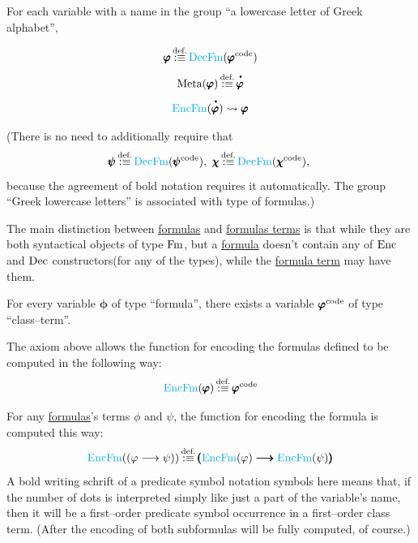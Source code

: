 \begin{metanotation}
\begin{definition}
For each variable with a name in the group ``a lowercase letter of Greek alphabet'',

\[
\pmb{\varphi}
\,{\stackrel{{\textrm{def.}}}{:\equiv}}\,
{\text{\textcolor{cyan}{DecFm}}}(\pmb{\varphi}^{\text{code}})
\]
\[
\text{Meta}(\pmb{\phi})
\equivdef
\meta{\pmb{\phi}}
\]
\[
\EncFm(\meta{\pmb{\phi}})
\reductsto
\pmb{\phi}
\]


(There is no need to additionally require that
\[
\pmb{\psi}
\equivdef
\DecFm({\pmb{\psi}^\code})
,\ %
\pmb{\chi}
\equivdef
\DecFm({\pmb{\chi}^\code})
,\ %
\]
because the agreement of bold notation requires it automatically. The group ``Greek lowercase letters'' is associated with type of formulas.)

\end{definition}

\begin{note}
The main distinction between \underline{formulas} and \underline{formulas terms} is that while they are both syntactical objects of type $\mathrm{Fm}$, but a \underline{formula} doesn't contain any of ${\text{Enc}}$ and ${\text{Dec}}$ constructors(for any of the types), while the \underline{formula term} may have them.
\end{note}
\begin{axiom}
For every variable $\pmb{\phi}$ of type ``formula'', there exists a variable  $\pmb{\varphi}^{\text{code}}$ of type ``class--term''.
\end{axiom}
\begin{definition}
The axiom above allows the function for encoding the formulas defined to be computed in the following way:
\[
{\text{\textcolor{cyan}{EncFm}}}(\pmb{\varphi})
\,{\stackrel{{\textrm{def.}}}{:\equiv}}\,
{\pmb{\varphi}}^{\text{code}}
\]
\end{definition}
\begin{definition}
For any \underline{formulas}'s terms $\phi$ and $\psi$, the function for encoding the formula is computed this way:
\[
{\text{\textcolor{cyan}{EncFm}}}((\varphi \longrightarrow \psi))
\,{\stackrel{{\textrm{def.}}}{:\equiv}}\,
\pmb{(}{\text{\textcolor{cyan}{EncFm}}}(\varphi) \pmb{\longrightarrow} {\text{\textcolor{cyan}{EncFm}}}(\psi)\pmb{)}
\]
A bold writing schrift of a predicate symbol notation symbols here means that, if the number of dots is interpreted simply like just a part of the variable's name, then it will be a first--order predicate symbol occurrence in a first--order class term. (After the encoding of both subformulas will be fully computed, of course.)
\end{definition}


\end{metanotation}
